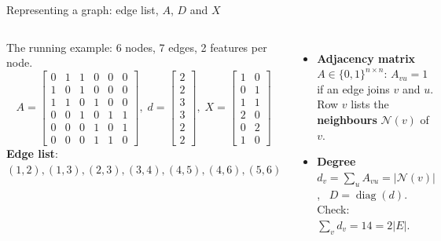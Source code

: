 \documentclass[aspectratio=169,10pt]{beamer}
\newcommand{\key}[1]{\textbf{\color{cAtt}#1}}
\DeclareMathOperator{\diag}{diag}
\newcommand{\N}{\mathcal N}
\newcommand{\toycoords}{\coordinate (c1) at (0,0.85); \coordinate (c2) at (0,-0.85); \coordinate (c3) at (1.3,0);
  \coordinate (c4) at (2.8,0); \coordinate (c5) at (4.1,0.85); \coordinate (c6) at (4.1,-0.85);}
\newcommand{\toyedges}{\foreach \a/\b in {1/2,1/3,2/3,3/4,4/5,4/6,5/6} \draw[gedge] (n\a)--(n\b);}
\newcommand{\toygraph}{\toycoords \foreach \i in {1,...,6} \node[gnode] (n\i) at (c\i) {\i}; \toyedges}
\begin{document}
\begin{frame}{Representing a graph: edge list, $A$, $D$ and $X$}
\begin{columns}[T,onlytextwidth]
\centering
{}

\vspace{0.5mm}
{\scriptsize\color{cTok}The running example: 6 nodes, 7 edges, 2 features per node.}
\vspace{-1mm}
{\footnotesize
\[
 A=\begin{bmatrix}
 0&1&1&0&0&0\\ 1&0&1&0&0&0\\ 1&1&0&1&0&0\\ 0&0&1&0&1&1\\ 0&0&0&1&0&1\\ 0&0&0&1&1&0
 \end{bmatrix}\!,\;
 d=\begin{bmatrix}2\\2\\3\\3\\2\\2\end{bmatrix}\!,\;
 X=\begin{bmatrix}1&0\\0&1\\1&1\\2&0\\0&2\\1&0\end{bmatrix}
\]}
\vspace{-2mm}
{\footnotesize \textbf{Edge list}: $(1,2),(1,3),(2,3),(3,4),(4,5),(4,6),(5,6)$}
\footnotesize
\begin{itemize}
  \item \key{Adjacency matrix} $A\in\{0,1\}^{n\times n}$: $A_{vu}=1$ if an edge joins $v$ and $u$.
        Row $v$ lists the \key{neighbours} $\N(v)$ of $v$.
  \item \key{Degree} $d_v=\sum_u A_{vu}=|\N(v)|$, \ $D=\diag(d)$. Check: $\sum_v d_v=14=2|E|$.

\end{itemize}
\end{columns}
\end{frame}
\end{document}
